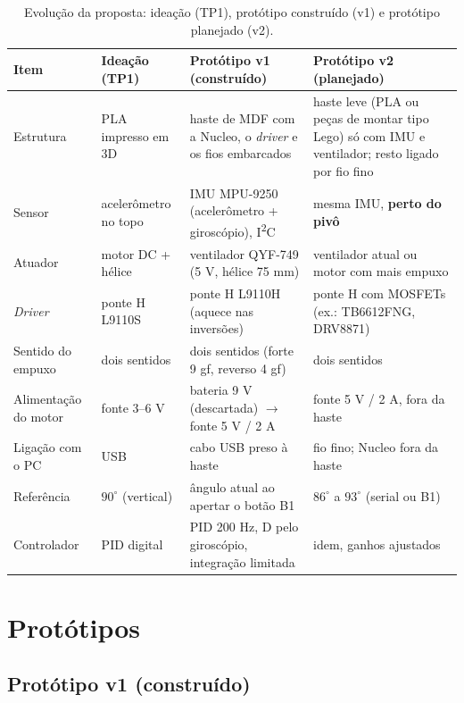 \documentclass[a4paper,11pt]{article}
\begin{document}
\begin{table}[!htb]
\centering\small
\caption{Evolução da proposta: ideação (TP1), protótipo construído (v1) e protótipo planejado (v2).}
\label{tab:evolucao}
\begin{tabularx}{\textwidth}{@{}l>{\raggedright}X>{\raggedright}X>{\raggedright\arraybackslash}X@{}}
\toprule
\textbf{Item} & \textbf{Ideação (TP1)} & \textbf{Protótipo v1 (construído)} & \textbf{Protótipo v2 (planejado)} \\
\midrule
Estrutura & PLA impresso em 3D & haste de MDF com a Nucleo, o \textit{driver} e os fios embarcados & haste leve (PLA ou peças de montar tipo Lego) só com IMU e ventilador; resto ligado por fio fino \\
Sensor & acelerômetro no topo & IMU MPU-9250 (acelerômetro + giroscópio), I\textsuperscript{2}C & mesma IMU, \textbf{perto do pivô} \\
Atuador & motor DC + hélice & ventilador QYF-749 (5 V, hélice 75 mm) & ventilador atual ou motor com mais empuxo \\
\textit{Driver} & ponte H L9110S & ponte H L9110H (aquece nas inversões) & ponte H com MOSFETs (ex.: TB6612FNG, DRV8871) \\
Sentido do empuxo & dois sentidos & dois sentidos (forte 9 gf, reverso 4 gf) & dois sentidos \\
Alimentação do motor & fonte 3--6 V & bateria 9 V (descartada) $\rightarrow$ fonte 5 V / 2 A & fonte 5 V / 2 A, fora da haste \\
Ligação com o PC & USB & cabo USB preso à haste & fio fino; Nucleo fora da haste \\
Referência & $90^\circ$ (vertical) & ângulo atual ao apertar o botão B1 & $86^\circ$ a $93^\circ$ (serial ou B1) \\
Controlador & PID digital & PID 200 Hz, D pelo giroscópio, integração limitada & idem, ganhos ajustados \\
\bottomrule
\end{tabularx}
\end{table}

\section{Protótipos}
\label{sec:prototipo}

\subsection{Protótipo v1 (construído)}
\end{document}

